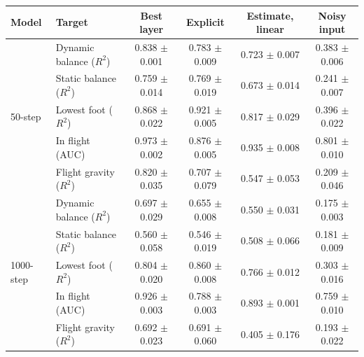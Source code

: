 \begin{tabular}{llcccc}
\toprule
Model & Target & Best layer & Explicit & Estimate, linear & Noisy input \\
\midrule
\multirow{5}{*}{50-step} & Dynamic balance ($R^2$) & 0.838 $\pm$ 0.001 & 0.783 $\pm$ 0.009 & 0.723 $\pm$ 0.007 & 0.383 $\pm$ 0.006 \\
 & Static balance ($R^2$) & 0.759 $\pm$ 0.014 & 0.769 $\pm$ 0.019 & 0.673 $\pm$ 0.014 & 0.241 $\pm$ 0.007 \\
 & Lowest foot ($R^2$) & 0.868 $\pm$ 0.022 & 0.921 $\pm$ 0.005 & 0.817 $\pm$ 0.029 & 0.396 $\pm$ 0.022 \\
 & In flight (AUC) & 0.973 $\pm$ 0.002 & 0.876 $\pm$ 0.005 & 0.935 $\pm$ 0.008 & 0.801 $\pm$ 0.010 \\
 & Flight gravity ($R^2$) & 0.820 $\pm$ 0.035 & 0.707 $\pm$ 0.079 & 0.547 $\pm$ 0.053 & 0.209 $\pm$ 0.046 \\
\midrule
\multirow{5}{*}{1000-step} & Dynamic balance ($R^2$) & 0.697 $\pm$ 0.029 & 0.655 $\pm$ 0.008 & 0.550 $\pm$ 0.031 & 0.175 $\pm$ 0.003 \\
 & Static balance ($R^2$) & 0.560 $\pm$ 0.058 & 0.546 $\pm$ 0.019 & 0.508 $\pm$ 0.066 & 0.181 $\pm$ 0.009 \\
 & Lowest foot ($R^2$) & 0.804 $\pm$ 0.020 & 0.860 $\pm$ 0.008 & 0.766 $\pm$ 0.012 & 0.303 $\pm$ 0.016 \\
 & In flight (AUC) & 0.926 $\pm$ 0.003 & 0.788 $\pm$ 0.003 & 0.893 $\pm$ 0.001 & 0.759 $\pm$ 0.010 \\
 & Flight gravity ($R^2$) & 0.692 $\pm$ 0.023 & 0.691 $\pm$ 0.060 & 0.405 $\pm$ 0.176 & 0.193 $\pm$ 0.022 \\
\bottomrule
\end{tabular}
